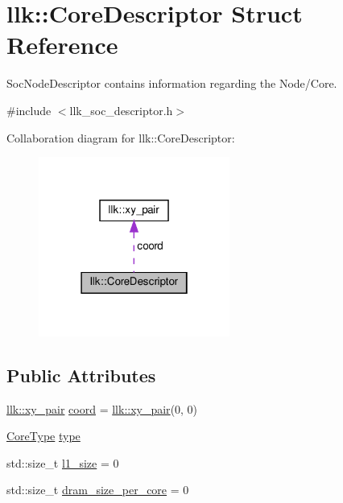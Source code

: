 \hypertarget{structllk_1_1CoreDescriptor}{}\section{llk\+:\+:Core\+Descriptor Struct Reference}
\label{structllk_1_1CoreDescriptor}


Soc\+Node\+Descriptor contains information regarding the Node/\+Core.  




{\ttfamily \#include $<$llk\+\_\+soc\+\_\+descriptor.\+h$>$}



Collaboration diagram for llk\+:\+:Core\+Descriptor\+:\nopagebreak
\begin{figure}[H]
\begin{center}
\leavevmode
\includegraphics[width=178pt]{structllk_1_1CoreDescriptor__coll__graph}
\end{center}
\end{figure}
\subsection*{Public Attributes}
\begin{DoxyCompactItemize}
\item 
\hyperlink{structllk_1_1xy__pair}{llk\+::xy\+\_\+pair} \hyperlink{structllk_1_1CoreDescriptor_aa32a249d368698c0dd0faa96a483f073}{coord} = \hyperlink{structllk_1_1xy__pair}{llk\+::xy\+\_\+pair}(0, 0)
\item 
\hyperlink{namespacellk_ad3e730e596589754342a98abd7021ed4}{Core\+Type} \hyperlink{structllk_1_1CoreDescriptor_a7191de431135e380831699043a13b26d}{type}
\item 
std\+::size\+\_\+t \hyperlink{structllk_1_1CoreDescriptor_a4e20170592b4452b98402bafb139e89d}{l1\+\_\+size} = 0
\item 
std\+::size\+\_\+t \hyperlink{structllk_1_1CoreDescriptor_aafc94079c5c809b77dece07d39d48666}{dram\+\_\+size\+\_\+per\+\_\+core} = 0
\end{DoxyCompactItemize}


